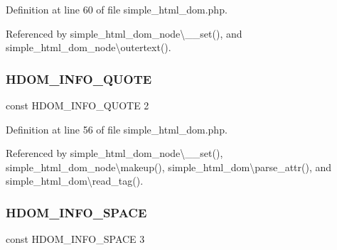 Definition at line 60 of file simple\+\_\+html\+\_\+dom.\+php.



Referenced by simple\+\_\+html\+\_\+dom\+\_\+node\textbackslash{}\+\_\+\+\_\+set(), and simple\+\_\+html\+\_\+dom\+\_\+node\textbackslash{}outertext().

\hypertarget{simple__html__dom_8php_a5279528b3cf095b0488b0b005607f909}{}\label{simple__html__dom_8php_a5279528b3cf095b0488b0b005607f909} 
\subsubsection{\texorpdfstring{H\+D\+O\+M\+\_\+\+I\+N\+F\+O\+\_\+\+Q\+U\+O\+TE}{HDOM\_INFO\_QUOTE}}
{\footnotesize\ttfamily const H\+D\+O\+M\+\_\+\+I\+N\+F\+O\+\_\+\+Q\+U\+O\+TE 2}



Definition at line 56 of file simple\+\_\+html\+\_\+dom.\+php.



Referenced by simple\+\_\+html\+\_\+dom\+\_\+node\textbackslash{}\+\_\+\+\_\+set(), simple\+\_\+html\+\_\+dom\+\_\+node\textbackslash{}makeup(), simple\+\_\+html\+\_\+dom\textbackslash{}parse\+\_\+attr(), and simple\+\_\+html\+\_\+dom\textbackslash{}read\+\_\+tag().

\hypertarget{simple__html__dom_8php_a6ad37ea016cdee2f705b1e475ed7a285}{}\label{simple__html__dom_8php_a6ad37ea016cdee2f705b1e475ed7a285} 
\subsubsection{\texorpdfstring{H\+D\+O\+M\+\_\+\+I\+N\+F\+O\+\_\+\+S\+P\+A\+CE}{HDOM\_INFO\_SPACE}}
{\footnotesize\ttfamily const H\+D\+O\+M\+\_\+\+I\+N\+F\+O\+\_\+\+S\+P\+A\+CE 3}



